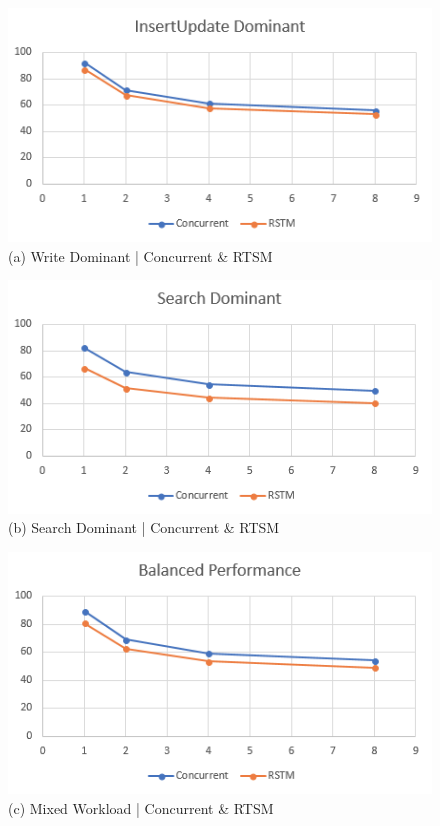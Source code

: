\documentclass[letterpaper, 10 pt, conference]{ieeeconf}
\begin{document}
\begin{figure}[thpb]
	\centering
	\includegraphics[scale=.6]{WriteDominatedConcurrent.png}
	\caption{(a) Write Dominant | Concurrent \& RTSM}
	\label{writeDom1}
\end{figure}

\begin{figure}[thpb]
	\centering
	\includegraphics[scale=.6]{SearchDominatedConcurrent.png}
	\caption{(b) Search Dominant | Concurrent \& RTSM}
	\label{searchDom1}
\end{figure}

\begin{figure}[thpb]
	\centering
	\includegraphics[scale=.6]{mixedWorkloadConcurrent.png}
	
	\caption{(c) Mixed Workload | Concurrent \& RTSM}
	\label{mixedWork1}
\end{figure}
\end{document}
